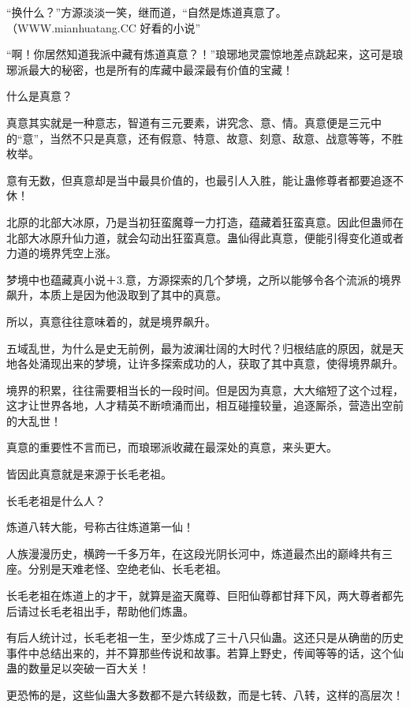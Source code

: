 
\begin{this_body}

“换什么？”方源淡淡一笑，继而道，“自然是炼道真意了。（WWW.mianhuatang.CC 好看的小说”

“啊！你居然知道我派中藏有炼道真意？！”琅琊地灵震惊地差点跳起来，这可是琅琊派最大的秘密，也是所有的库藏中最深最有价值的宝藏！

什么是真意？

真意其实就是一种意志，智道有三元要素，讲究念、意、情。真意便是三元中的“意”，当然不只是真意，还有假意、特意、故意、刻意、敌意、战意等等，不胜枚举。

意有无数，但真意却是当中最具价值的，也最引人入胜，能让蛊修尊者都要追逐不休！

北原的北部大冰原，乃是当初狂蛮魔尊一力打造，蕴藏着狂蛮真意。因此但蛊师在北部大冰原升仙力道，就会勾动出狂蛮真意。蛊仙得此真意，便能引得变化道或者力道的境界凭空上涨。

梦境中也蕴藏真小说＋3.意，方源探索的几个梦境，之所以能够令各个流派的境界飙升，本质上是因为他汲取到了其中的真意。

所以，真意往往意味着的，就是境界飙升。

五域乱世，为什么是史无前例，最为波澜壮阔的大时代？归根结底的原因，就是天地各处涌现出来的梦境，让许多探索成功的人，获取了其中真意，使得境界飙升。

境界的积累，往往需要相当长的一段时间。但是因为真意，大大缩短了这个过程，这才让世界各地，人才精英不断喷涌而出，相互碰撞较量，追逐厮杀，营造出空前的大乱世！

真意的重要性不言而已，而琅琊派收藏在最深处的真意，来头更大。

皆因此真意就是来源于长毛老祖。

长毛老祖是什么人？

炼道八转大能，号称古往炼道第一仙！

人族漫漫历史，横跨一千多万年，在这段光阴长河中，炼道最杰出的巅峰共有三座。分别是天难老怪、空绝老仙、长毛老祖。

长毛老祖在炼道上的才干，就算是盗天魔尊、巨阳仙尊都甘拜下风，两大尊者都先后请过长毛老祖出手，帮助他们炼蛊。

有后人统计过，长毛老祖一生，至少炼成了三十八只仙蛊。这还只是从确凿的历史事件中总结出来的，并不算那些传说和故事。若算上野史，传闻等等的话，这个仙蛊的数量足以突破一百大关！

更恐怖的是，这些仙蛊大多数都不是六转级数，而是七转、八转，这样的高层次！


\end{this_body}
